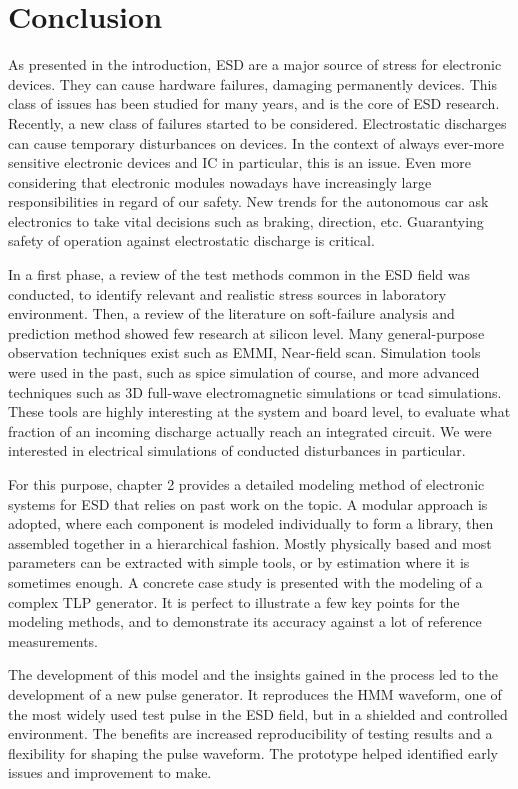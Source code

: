 \chapter{Conclusion}
\label{sec:final-conclusion}

As presented in the introduction, ESD are a major source of stress for electronic devices.
They can cause hardware failures, damaging permanently devices.
This class of issues has been studied for many years, and is the core of ESD research.
Recently, a new class of failures started to be considered.
Electrostatic discharges can cause temporary disturbances on devices.
In the context of always ever-more sensitive electronic devices and IC in particular, this is an issue.
Even more considering that electronic modules nowadays have increasingly large responsibilities in regard of our safety.
New trends for the autonomous car ask electronics to take vital decisions such as braking, direction, etc.
Guarantying safety of operation against electrostatic discharge is critical.

In a first phase, a review of the test methods common in the ESD field was conducted, to identify relevant and realistic stress sources in laboratory environment.
Then, a review of the literature on soft-failure analysis and prediction method showed few research at silicon level.
Many general-purpose observation techniques exist such as EMMI, Near-field scan.
Simulation tools were used in the past, such as \gls{spice} simulation of course, and more advanced techniques such as 3D full-wave electromagnetic simulations or \gls{tcad} simulations.
These tools are highly interesting at the system and board level, to evaluate what fraction of an incoming discharge actually reach an integrated circuit.
We were interested in electrical simulations of conducted disturbances in particular.

For this purpose, chapter 2 provides a detailed modeling method of electronic systems for ESD that relies on past work on the topic.
A modular approach is adopted, where each component is modeled individually to form a library, then assembled together in a hierarchical fashion.
Mostly physically based and most parameters can be extracted with simple tools, or by estimation where it is sometimes enough.
A concrete case study is presented with the modeling of a complex TLP generator.
It is perfect to illustrate a few key points for the modeling methods, and to demonstrate its accuracy against a lot of reference measurements.

The development of this model and the insights gained in the process led to the development of a new pulse generator.
It reproduces the HMM waveform, one of the most widely used test pulse in the ESD field, but in a shielded and controlled environment.
The benefits are increased reproducibility of testing results and a flexibility for shaping the pulse waveform.
The prototype helped identified early issues and improvement to make.

